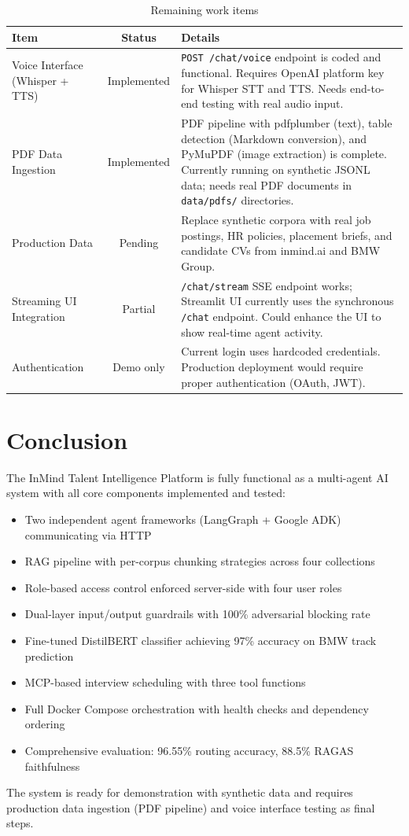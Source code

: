 \documentclass[12pt, a4paper]{article}
\begin{document}
\begin{table}[H]
\centering
\caption{Remaining work items}
\begin{tabularx}{\textwidth}{l c X}
\toprule
\textbf{Item} & \textbf{Status} & \textbf{Details} \\
\midrule
Voice Interface (Whisper + TTS) & Implemented & \texttt{POST /chat/voice} endpoint is coded and functional. Requires OpenAI platform key for Whisper STT and TTS. Needs end-to-end testing with real audio input. \\
\addlinespace
PDF Data Ingestion & Implemented & PDF pipeline with pdfplumber (text), table detection (Markdown conversion), and PyMuPDF (image extraction) is complete. Currently running on synthetic JSONL data; needs real PDF documents in \texttt{data/pdfs/} directories. \\
\addlinespace
Production Data & Pending & Replace synthetic corpora with real job postings, HR policies, placement briefs, and candidate CVs from inmind.ai and BMW Group. \\
\addlinespace
Streaming UI Integration & Partial & \texttt{/chat/stream} SSE endpoint works; Streamlit UI currently uses the synchronous \texttt{/chat} endpoint. Could enhance the UI to show real-time agent activity. \\
\addlinespace
Authentication & Demo only & Current login uses hardcoded credentials. Production deployment would require proper authentication (OAuth, JWT). \\
\bottomrule
\end{tabularx}
\label{tab:remaining}
\end{table}

\section{Conclusion}

The InMind Talent Intelligence Platform is fully functional as a multi-agent AI system with all core components implemented and tested:

\begin{itemize}[leftmargin=1.5em]
    \item Two independent agent frameworks (LangGraph + Google ADK) communicating via HTTP
    \item RAG pipeline with per-corpus chunking strategies across four collections
    \item Role-based access control enforced server-side with four user roles
    \item Dual-layer input/output guardrails with 100\% adversarial blocking rate
    \item Fine-tuned DistilBERT classifier achieving 97\% accuracy on BMW track prediction
    \item MCP-based interview scheduling with three tool functions
    \item Full Docker Compose orchestration with health checks and dependency ordering
    \item Comprehensive evaluation: 96.55\% routing accuracy, 88.5\% RAGAS faithfulness
\end{itemize}

The system is ready for demonstration with synthetic data and requires production data ingestion (PDF pipeline) and voice interface testing as final steps.
\end{document}

